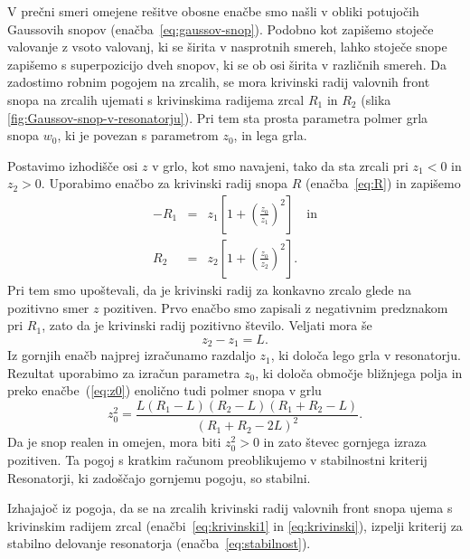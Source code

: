 V prečni smeri omejene rešitve obosne enačbe smo našli v obliki potujočih
Gaussovih snopov (enačba~\ref{eq:gaussov-snop}). 
Podobno kot zapišemo stoječe valovanje z vsoto valovanj, ki se širita v nasprotnih smereh,
lahko stoječe snope zapišemo s superpozicijo dveh snopov, ki se ob osi širita v različnih smereh. 
Da zadostimo robnim pogojem na zrcalih, se mora krivinski radij valovnih front 
snopa na zrcalih ujemati s krivinskima radijema zrcal $R_{1}$ in $R_{2}$ 
(slika \ref{fig:Gaussov-snop-v-resonatorju}).
Pri tem sta prosta parametra polmer grla snopa $w_0$, 
ki je povezan s parametrom $z_{0}$, in lega grla. 

Postavimo izhodišče osi $z$ v grlo, kot smo
navajeni, tako da sta zrcali pri $z_{1}<0$ in $z_{2}>0$. Uporabimo enačbo
za krivinski radij snopa $R$ (enačba~\ref{eq:R})  in zapišemo 
\begin{eqnarray}
-R_{1} & = & z_{1}\left[1+\left(\frac{z_{0}}{z_{1}}\right)^{2}\right] \quad  \label{eq:krivinski1} \textrm{in}\\
R_{2} & = & z_{2}\left[1+\left(\frac{z_{0}}{z_{2}}\right)^{2}\right].
\label{eq:krivinski}
\end{eqnarray}
Pri tem smo upoštevali, da je krivinski radij za konkavno zrcalo glede na 
pozitivno smer $z$ pozitiven. Prvo enačbo smo zapisali z negativnim 
predznakom pri $R_1$, zato da je krivinski radij pozitivno število.
Veljati mora še 
\begin{equation}
z_{2}-z_{1}=L.
\label{eq:razlikaz}
\end{equation}
Iz gornjih enačb najprej izračunamo razdaljo $z_{1}$, ki določa
lego grla v resonatorju. Rezultat uporabimo za izračun parametra $z_{0}$, ki določa
območje bližnjega polja in preko enačbe~(\ref{eq:z0}) enolično tudi polmer snopa v grlu
\begin{equation}
z_{0}^{2}=\frac{L(R_{1}-L)(R_{2}-L)(R_{1}+R_{2}-L)}{(R_{1}+R_{2}-2L)^{2}}.
\label{eq:z0_stab}
\end{equation}
Da je snop realen in omejen, mora biti $z_{0}^{2}>0$ in zato števec
gornjega izraza pozitiven. Ta pogoj s kratkim računom preoblikujemo
v stabilnostni kriterij
Resonatorji, ki zadoščajo gornjemu pogoju, so stabilni. 

\begin{definition}
Izhajajoč iz pogoja, da se na zrcalih krivinski radij valovnih front snopa ujema s krivinskim
radijem zrcal (enačbi~\ref{eq:krivinski1} in \ref{eq:krivinski}), izpelji 
kriterij za stabilno delovanje resonatorja 
(enačba~\ref{eq:stabilnost}).
\end{definition}

